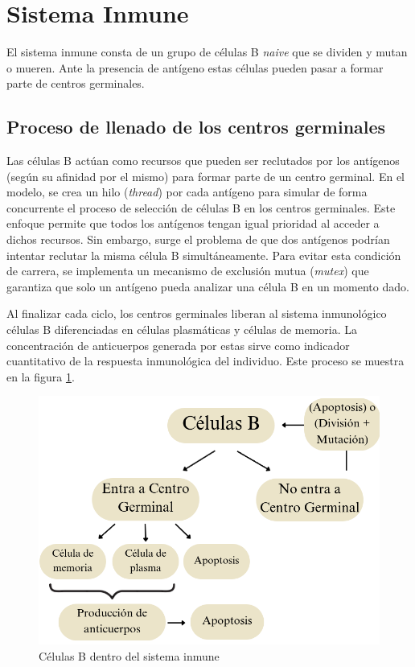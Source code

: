 \section{Sistema Inmune}

El sistema inmune consta de un grupo de células B \textit{naive} que se dividen y mutan o mueren. Ante la presencia de antígeno estas células pueden pasar a formar parte de centros germinales. 

\subsection*{Proceso de llenado de los centros germinales}
Las células B actúan como recursos que pueden ser reclutados por los antígenos (según su afinidad por el mismo) para formar parte de un centro germinal. En el modelo, se crea un hilo (\textit{thread}) por cada antígeno para simular de forma concurrente el proceso de selección de células B en los centros germinales. Este enfoque permite que todos los antígenos tengan igual prioridad al acceder a dichos recursos. Sin embargo, surge el problema de que dos antígenos podrían intentar reclutar la misma célula B simultáneamente. Para evitar esta condición de carrera, se implementa un mecanismo de exclusión mutua (\textit{mutex}) que garantiza que solo un antígeno pueda analizar una célula B en un momento dado.

Al finalizar cada ciclo, los centros germinales liberan al sistema inmunológico células B diferenciadas en células plasmáticas y células de memoria. La concentración de anticuerpos generada por estas sirve como indicador cuantitativo de la respuesta inmunológica del individuo. Este proceso se muestra en la figura \ref{fig:is}.

\begin{figure}[H] %
    \centering
    \includegraphics[width=1\textwidth]{Graphics/is.png}
    \caption{Células B dentro del sistema inmune}
    \label{fig:is}
\end{figure}




